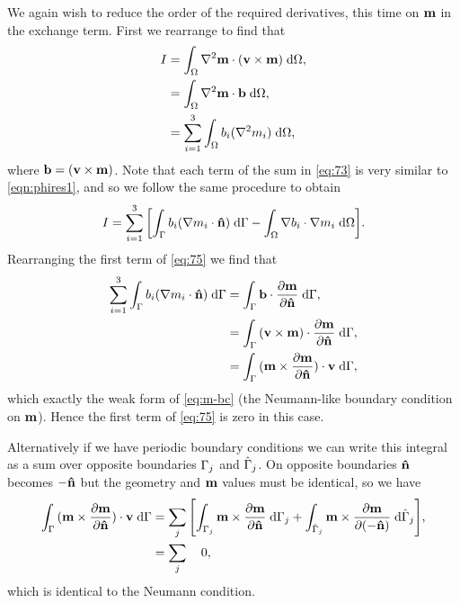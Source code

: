 We again wish to reduce the order of the required derivatives, this time on $\boldsymbol{\mathrm{m}}$ in the exchange term.
First we rearrange to find that
\begin{equation}
  \begin{aligned}
    I &= \intd{\lap \mv \cdot (\testv \times \mv)}, \\
      &= \intd{\lap \mv \cdot \bv}, \\
      &= \sum_{i=1}^3 \intd{ b_i (\lap m_i)},
  \end{aligned}
\label{eq:73}
\end{equation}
where ${\boldsymbol{\mathrm{b}}} = (\boldsymbol{\mathrm{v}} \times \boldsymbol{\mathrm{m}})$.
Note that each term of the sum in \cref{eq:73} is very similar to \cref{eqn:phires1}, and so we follow the same procedure to obtain
\begin{equation}
  I = \sum_{i=1}^3 \bigs{\intb{b_i (\grad m_i \cdot \nv)} - \intd{\grad b_i \cdot \grad m_i}}.
\label{eq:75}
\end{equation}
Rearranging the first term of \cref{eq:75} we find that
\begin{equation}
  \begin{aligned}
    \sum_{i=1}^3 {\int_{{\Gamma}} {b_i (\nabla m_i \cdot \boldsymbol{\mathrm{\hat{n}}})} {\; \mathrm{{d}}} {{\Gamma}}}
    &= {\int_{{\Gamma}} {{\boldsymbol{\mathrm{b}}} \cdot \frac{\partial \boldsymbol{\mathrm{m}}}{\partial \boldsymbol{\mathrm{\hat{n}}}}} {\; \mathrm{{d}}} {{\Gamma}}}, \\
    &=  {\int_{{\Gamma}} {(\boldsymbol{\mathrm{v}} \times \boldsymbol{\mathrm{m}}) \cdot \frac{\partial \boldsymbol{\mathrm{m}}}{\partial \boldsymbol{\mathrm{\hat{n}}}}} {\; \mathrm{{d}}} {{\Gamma}}}, \\
    &=  {\int_{{\Gamma}} {(\boldsymbol{\mathrm{m}} \times \frac{\partial \boldsymbol{\mathrm{m}}}{\partial \boldsymbol{\mathrm{\hat{n}}}}) \cdot \boldsymbol{\mathrm{v}}} {\; \mathrm{{d}}} {{\Gamma}}},
  \end{aligned}
\end{equation}
which exactly the weak form of \cref{eq:m-bc} (the Neumann-like boundary condition on $\boldsymbol{\mathrm{m}}$).
Hence the first term of \cref{eq:75} is zero in this case.

Alternatively if we have periodic boundary conditions we can write this integral as a sum over opposite boundaries ${\Gamma}_j$ and $\hat{{\Gamma}}_j$.
On opposite boundaries $\boldsymbol{\mathrm{\hat{n}}}$ becomes $-\boldsymbol{\mathrm{\hat{n}}}$ but the geometry and $\boldsymbol{\mathrm{m}}$ values must be identical, so we have
\begin{equation}
  \begin{aligned}
    \intb{(\mv \times \pd{\mv}{\nv}) \cdot \testv}
    &= \sum_j \bigs{\intd[\boundd_j]{\mv \times \pd{\mv}{\nv}}
    + \intd[\hat{\boundd}_j]{\mv \times \pd{\mv}{(-\nv)}}}, \\
    & = \sum_j \quad 0 ,
    \label{eq:95}
  \end{aligned}
\end{equation}
which is identical to the Neumann condition.

